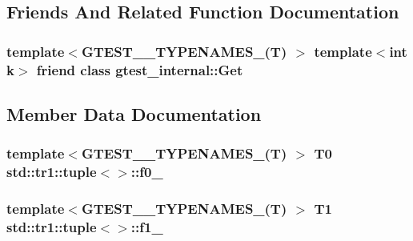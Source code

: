 \subsection{Friends And Related Function Documentation}
\subsubsection[{\texorpdfstring{gtest\+\_\+internal\+::\+Get}{gtest_internal::Get}}]{\setlength{\rightskip}{0pt plus 5cm}template$<$G\+T\+E\+S\+T\+\_\+\_\+\+T\+Y\+P\+E\+N\+A\+M\+E\+S\+\_\+(\+T) $>$ template$<$int k$>$ friend class {\bf gtest\+\_\+internal\+::\+Get}\hspace{0.3cm}{\ttfamily [friend]}}\hypertarget{classstd_1_1tr1_1_1tuple_aeeed38755abdaa78587dd1eac9ccc950}{}\label{classstd_1_1tr1_1_1tuple_aeeed38755abdaa78587dd1eac9ccc950}


\subsection{Member Data Documentation}
\subsubsection[{\texorpdfstring{f0\+\_\+}{f0_}}]{\setlength{\rightskip}{0pt plus 5cm}template$<$G\+T\+E\+S\+T\+\_\+\_\+\+T\+Y\+P\+E\+N\+A\+M\+E\+S\+\_\+(\+T) $>$ T0 {\bf std\+::tr1\+::tuple}$<$$>$\+::f0\+\_\+}\hypertarget{classstd_1_1tr1_1_1tuple_a771b1d99e8800fb284acd04bca838cbb}{}\label{classstd_1_1tr1_1_1tuple_a771b1d99e8800fb284acd04bca838cbb}
\subsubsection[{\texorpdfstring{f1\+\_\+}{f1_}}]{\setlength{\rightskip}{0pt plus 5cm}template$<$G\+T\+E\+S\+T\+\_\+\_\+\+T\+Y\+P\+E\+N\+A\+M\+E\+S\+\_\+(\+T) $>$ T1 {\bf std\+::tr1\+::tuple}$<$$>$\+::f1\+\_\+}\hypertarget{classstd_1_1tr1_1_1tuple_a7cccf899dedc626c51fa4f6921d0ac52}{}\label{classstd_1_1tr1_1_1tuple_a7cccf899dedc626c51fa4f6921d0ac52}

